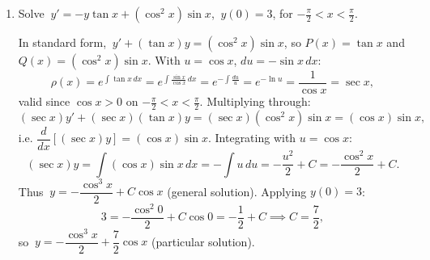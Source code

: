\documentclass[10pt]{article}
\begin{document}
\begin{enumerate}[leftmargin=*, label=\numbox{\arabic*}]
\item
    \begin{problem}[\vspace{7cm}]
        Solve \(\ y' = -y\tan x + (\cos^2 x)\sin x\), \(\ y(0) = 3\), for \(-\tfrac{\pi}{2} < x < \tfrac{\pi}{2}\).
    \end{problem}
    \begin{solution}
        In standard form, \(\ y' + (\tan x)y = (\cos^2 x)\sin x\), so \(P(x) = \tan x\) and
        \(Q(x) = (\cos^2 x)\sin x\). With \(u = \cos x\), \(du = -\sin x\,dx\):
        \[
            \rho(x) = e^{\int \tan x\,dx} = e^{\int \frac{\sin x}{\cos x}\,dx}
            = e^{-\int \frac{du}{u}} = e^{-\ln u} = \frac{1}{\cos x} = \sec x,
        \]
        valid since \(\cos x > 0\) on \(-\tfrac{\pi}{2} < x < \tfrac{\pi}{2}\). Multiplying through:
        \[
            (\sec x)y' + (\sec x)(\tan x)y = (\sec x)(\cos^2 x)\sin x = (\cos x)\sin x,
        \]
        i.e. \(\dfrac{d}{dx}\!\left[(\sec x)y\right] = (\cos x)\sin x\). Integrating with \(u = \cos x\):
        \[
            (\sec x)y = \int (\cos x)\sin x\,dx = -\int u\,du = -\frac{u^2}{2} + C = -\frac{\cos^2 x}{2} + C.
        \]
        Thus \(\ y = -\dfrac{\cos^3 x}{2} + C\cos x\) (general solution). Applying \(y(0) = 3\):
        \[
            3 = -\frac{\cos^2 0}{2} + C\cos 0 = -\frac{1}{2} + C \implies C = \frac{7}{2},
        \]
        so \(\ y = -\dfrac{\cos^3 x}{2} + \dfrac{7}{2}\cos x\) (particular solution).
    \end{solution}

\end{enumerate}
\end{document}
